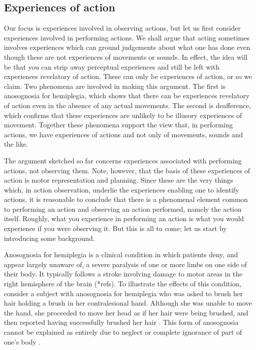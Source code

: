 \documentclass[12pt,\papersize]{extarticle}
\begin{document}
\subsection{Experiences of action}
Our focus is experiences involved in observing actions, but let us first consider experiences involved in performing actions.  We shall argue that acting sometimes involves experiences which can ground judgements about what one has done even though these are not experiences of movements or sounds.  In effect, the idea will be that you can strip away perceptual experiences and still be left with experiences revelatory of action.  These can only be experiences of action, or so we claim.  Two phenomena are involved in making this argument.  The first is anosognosia for hemiplegia, which shows that there can be experiences revelatory of action even in the absence of any actual movements.  The second is deafference, which confirms that these experiences are unlikely to be illusory experiences of movement. Together these phenomena support the view that, in performing actions, we have experiences of actions and not only of movements, sounds and the like.  

The argument sketched so far concerns experiences associated with performing actions, not observing them.  Note, however, that the basis of these experiences of action is motor representation and planning.  Since these are the very things which, in action observation, underlie the experiences enabling one to identify actions, it is reasonable to conclude that there is a phenomenal element common to performing an action and observing an action performed, namely the action itself.  Roughly, what you experience in performing an action is what you would experience if you were observing it.  But this is all to come; let us start by introducing some background. 

Anosognosia for hemiplegia is a clinical condition in which patients deny, and appear largely unaware of, a severe paralysis of one or more limbs on one side of their body.  It typically follows a stroke involving damage to motor areas in the right hemisphere of the brain (*refs).  To illustrate the effects of this condition, consider a subject with anosognosia for hemiplegia who was asked to brush her hair holding a brush in her contralesional hand.  Although she was unable to move the hand, she proceeded to move her head as if her hair were being brushed, and then reported having successfully brushed her hair \citep{berti:2008_motor}. This form of anosognosia cannot be explained as entirely due to neglect or complete ignorance of part of one's body \citep[p.\ 165]{berti:2008_motor}.  
\end{document}

